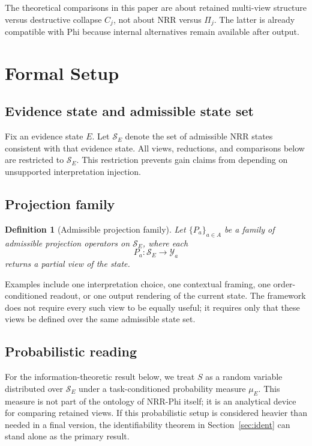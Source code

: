 \documentclass[11pt,a4paper]{article}
\newtheorem{definition}{Definition}
\begin{document}
The theoretical comparisons in this paper are about retained multi-view structure versus destructive collapse $C_j$, not about NRR versus $\Pi_j$. The latter is already compatible with Phi because internal alternatives remain available after output.

\section{Formal Setup}
\label{sec:setup}

\subsection{Evidence state and admissible state set}

Fix an evidence state $E$. Let $\mathcal{S}_E$ denote the set of admissible NRR states consistent with that evidence state. All views, reductions, and comparisons below are restricted to $\mathcal{S}_E$. This restriction prevents gain claims from depending on unsupported interpretation injection.

\subsection{Projection family}

\begin{definition}[Admissible projection family]
Let $\{P_a\}_{a \in A}$ be a family of admissible projection operators on $\mathcal{S}_E$, where each
\begin{equation}
P_a : \mathcal{S}_E \to \mathcal{Y}_a
\end{equation}
returns a partial view of the state.
\end{definition}

Examples include one interpretation choice, one contextual framing, one order-conditioned readout, or one output rendering of the current state. The framework does not require every such view to be equally useful; it requires only that these views be defined over the same admissible state set.

\subsection{Probabilistic reading}

For the information-theoretic result below, we treat $S$ as a random variable distributed over $\mathcal{S}_E$ under a task-conditioned probability measure $\mu_E$. This measure is not part of the ontology of NRR-Phi itself; it is an analytical device for comparing retained views. If this probabilistic setup is considered heavier than needed in a final version, the identifiability theorem in Section~\ref{sec:ident} can stand alone as the primary result.
\end{document}
